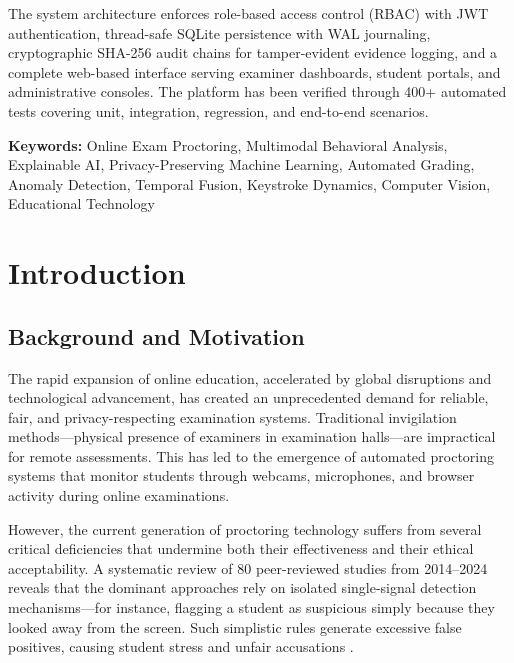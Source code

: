 \documentclass{article}
\newcommand\myemptypage{
    \null
    \thispagestyle{empty}
    \addtocounter{page}{-1}
    \newpage
}
\begin{document}
{The system architecture enforces role-based access control (RBAC) with JWT authentication, thread-safe SQLite persistence with WAL journaling, cryptographic SHA-256 audit chains for tamper-evident evidence logging, and a complete web-based interface serving examiner dashboards, student portals, and administrative consoles. The platform has been verified through 400+ automated tests covering unit, integration, regression, and end-to-end scenarios.

\vspace{0.3cm}

\textbf{Keywords:} Online Exam Proctoring, Multimodal Behavioral Analysis, Explainable AI, Privacy-Preserving Machine Learning, Automated Grading, Anomaly Detection, Temporal Fusion, Keystroke Dynamics, Computer Vision, Educational Technology
}

\newpage

\tableofcontents
\myemptypage
\listoffigures
\listoftables

\renewcommand{\thepage}{\arabic{page}}
\setcounter{page}{1}
\newpage

\section{Introduction}
\label{sec:introduction}

\subsection{Background and Motivation}

The rapid expansion of online education, accelerated by global disruptions and technological advancement, has created an unprecedented demand for reliable, fair, and privacy-respecting examination systems. Traditional invigilation methods---physical presence of examiners in examination halls---are impractical for remote assessments. This has led to the emergence of automated proctoring systems that monitor students through webcams, microphones, and browser activity during online examinations.

However, the current generation of proctoring technology suffers from several critical deficiencies that undermine both their effectiveness and their ethical acceptability. A systematic review of 80 peer-reviewed studies from 2014--2024 \cite{systematic_review_2026} reveals that the dominant approaches rely on isolated single-signal detection mechanisms---for instance, flagging a student as suspicious simply because they looked away from the screen. Such simplistic rules generate excessive false positives, causing student stress and unfair accusations \cite{student_experience_2024}.
\end{document}
